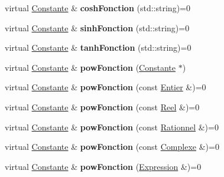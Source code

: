 \begin{DoxyCompactItemize}
\item 
\hypertarget{class_constante_ae0bf50b47928dc108de2f29231aefbeb}{virtual \hyperlink{class_constante}{Constante} \& {\bfseries cosh\-Fonction} (std\-::string)=0}\label{class_constante_ae0bf50b47928dc108de2f29231aefbeb}

\item 
\hypertarget{class_constante_adbdbe6e979fcdf68d2c38c8114d0dde6}{virtual \hyperlink{class_constante}{Constante} \& {\bfseries sinh\-Fonction} (std\-::string)=0}\label{class_constante_adbdbe6e979fcdf68d2c38c8114d0dde6}

\item 
\hypertarget{class_constante_a79f9e32d8dfe2980f9ad17733d5905fb}{virtual \hyperlink{class_constante}{Constante} \& {\bfseries tanh\-Fonction} (std\-::string)=0}\label{class_constante_a79f9e32d8dfe2980f9ad17733d5905fb}

\item 
\hypertarget{class_constante_a6218e67aef6b06f29d37b112206d56c6}{virtual \hyperlink{class_constante}{Constante} \& {\bfseries pow\-Fonction} (\hyperlink{class_constante}{Constante} $\ast$)}\label{class_constante_a6218e67aef6b06f29d37b112206d56c6}

\item 
\hypertarget{class_constante_a4de24bbfec26b381782d54f86699f5db}{virtual \hyperlink{class_constante}{Constante} \& {\bfseries pow\-Fonction} (const \hyperlink{class_entier}{Entier} \&)=0}\label{class_constante_a4de24bbfec26b381782d54f86699f5db}

\item 
\hypertarget{class_constante_aac4655c82f3adc298c242c1858a185de}{virtual \hyperlink{class_constante}{Constante} \& {\bfseries pow\-Fonction} (const \hyperlink{class_reel}{Reel} \&)=0}\label{class_constante_aac4655c82f3adc298c242c1858a185de}

\item 
\hypertarget{class_constante_acfa643e1f95d98b3eafb4275bbb533d5}{virtual \hyperlink{class_constante}{Constante} \& {\bfseries pow\-Fonction} (const \hyperlink{class_rationnel}{Rationnel} \&)=0}\label{class_constante_acfa643e1f95d98b3eafb4275bbb533d5}

\item 
\hypertarget{class_constante_aae63d1d974ef6fe0f516ce1cfcaff5eb}{virtual \hyperlink{class_constante}{Constante} \& {\bfseries pow\-Fonction} (const \hyperlink{class_complexe}{Complexe} \&)=0}\label{class_constante_aae63d1d974ef6fe0f516ce1cfcaff5eb}

\item 
\hypertarget{class_constante_ae7639614d627f4a87e477095e65b4896}{virtual \hyperlink{class_constante}{Constante} \& {\bfseries pow\-Fonction} (\hyperlink{class_expression}{Expression} \&)=0}\label{class_constante_ae7639614d627f4a87e477095e65b4896}


\end{DoxyCompactItemize}
